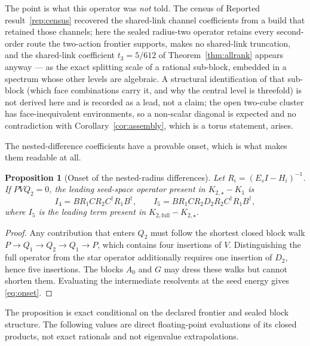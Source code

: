 \documentclass[11pt]{article}
\theoremstyle{plain}
\newtheorem{proposition}[theorem]{Proposition}
\theoremstyle{definition}
\theoremstyle{remark}
\newcommand{\chk}[1]{}
\newcommand{\dg}{^{\dagger}}
\begin{document}
The point is what this operator was \emph{not} told. The census of
Reported result~\ref{rep:census} recovered the shared-link channel
coefficients from a build that retained those channels; here the sealed
radius-two operator retains every second-order route the two-action frontier
supports, makes no shared-link truncation, and the shared-link coefficient
$t_3=5/612$ of Theorem~\ref{thm:allrank} appears anyway --- as the exact
splitting scale of a rational sub-block, embedded in a spectrum whose other
levels are algebraic. A structural identification of that sub-block (which
face combinations carry it, and why the central level is threefold) is not
derived here and is recorded as a lead, not a claim; the open two-cube
cluster has face-inequivalent environments, so a non-scalar diagonal is
expected and no contradiction with Corollary~\ref{cor:assembly}, which is a
torus statement, arises.
\chk{the sealed radius-two report passes its six float checks at stated tolerances}


The nested-difference coefficients have a provable onset, which is what makes
them readable at all.

\begin{proposition}[Onset of the nested-radius differences]\label{prop:onset}
Let $R_i=(E_sI-H_i)^{-1}$. If $PVQ_2=0$, the leading seed-space operator
present in $K_{2,\star}-K_1$ is
\begin{equation}\label{eq:onset}
  I_4=BR_1CR_2C\dg R_1B\dg,\qquad
  I_5=BR_1CR_2D_2R_2C\dg R_1B\dg,
\end{equation}
where $I_5$ is the leading term present in
$K_{2,\mathrm{full}}-K_{2,\star}$.
\end{proposition}

\begin{proof}
Any contribution that enters $Q_2$ must follow the shortest closed block walk
$P\to Q_1\to Q_2\to Q_1\to P$, which contains four insertions of $V$.
Distinguishing the full operator from the star operator additionally requires
one insertion of $D_2$, hence five insertions. The blocks $A_0$ and $G$ may
dress these walks but cannot shorten them. Evaluating the intermediate
resolvents at the seed energy gives \eqref{eq:onset}.
\end{proof}

The proposition is exact conditional on the declared frontier and sealed block
structure. The following values are direct floating-point evaluations of its
closed products, not exact rationals and not eigenvalue extrapolations.
\end{document}
